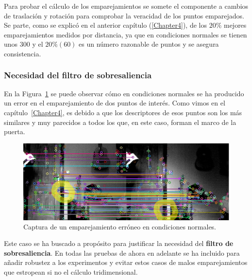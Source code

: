 Para probar el cálculo de los emparejamientos se somete el componente a cambios de traslación y rotación para comprobar la veracidad de los puntos emparejados. Se parte, como se explicó en el anterior capítulo (\ref{Chapter4}), de los $20\%$ mejores emparejamientos medidos por distancia, ya que en condiciones normales se tienen unos $300$ y el $20\% (60)$ es un número razonable de puntos y se asegura consistencia.

\subsubsection{Necesidad del filtro de sobresaliencia}

En la Figura~\ref{fig:error-matching} se puede observar cómo en condiciones normales se ha producido un error en el emparejamiento de dos puntos de interés. Como vimos en el capítulo~\ref{Chapter4}, es debido a que los descriptores de esos puntos son los más similares y muy parecidos a todos los que, en este caso, forman el marco de la puerta.


\begin{figure}[th]
\centering
\includegraphics[scale=0.6]{Figures/tests/matching-error.png}
\decoRule
\caption[Captura con un error de emparejamiento sin filtro de sobresaliencia]{Captura de un emparejamiento erróneo en condiciones normales.}
\label{fig:error-matching}
\end{figure}

Este caso se ha buscado a propósito para justificar la necesidad del \textbf{filtro de sobresaliencia}. En todas las pruebas de ahora en adelante se ha incluido para añadir robustez a los experimentos y evitar estos casos de malos emparejamientos que estropean si no el cálculo tridimensional.

